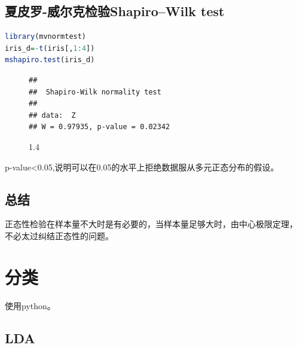 \documentclass[11pt,a4paper]{article}\usepackage[]{graphicx}\usepackage[]{color}
\makeatletter
\newenvironment{kframe}{%
 \def\at@end@of@kframe{}%
 \ifinner\ifhmode%
  \def\at@end@of@kframe{\end{minipage}}%
  \begin{minipage}{\columnwidth}%
 \fi\fi%
 \def\FrameCommand##1{\hskip\@totalleftmargin \hskip-\fboxsep
 \colorbox{shadecolor}{##1}\hskip-\fboxsep
     \hskip-\linewidth \hskip-\@totalleftmargin \hskip\columnwidth}%
 \MakeFramed {\advance\hsize-\width
   \@totalleftmargin\z@ \linewidth\hsize
   \@setminipage}}%
 {\par\unskip\endMakeFramed%
 \at@end@of@kframe}
\newenvironment{knitrout}{}{} %
\makeatother
\begin{document}
  \subsection{夏皮罗-威尔克检验Shapiro–Wilk test}
  \begin{lstlisting}[language=R, caption=Shapiro–Wilk test,label={labelkode}]
   library(mvnormtest)
iris_d=-t(iris[,1:4])
mshapiro.test(iris_d)
  \end{lstlisting}
  		\begin{figure}[H]
      \begin{center}
\begin{knitrout}
\color{fgcolor}\begin{kframe}
\begin{verbatim}
## 
## 	Shapiro-Wilk normality test
## 
## data:  Z
## W = 0.97935, p-value = 0.02342
\end{verbatim}
\end{kframe}
\end{knitrout}
      \caption{1.4}
      \end{center}
      \end{figure}
  p-value<0.05,说明可以在0.05的水平上拒绝数据服从多元正态分布的假设。
  
	\subsection{总结}
	正态性检验在样本量不大时是有必要的，当样本量足够大时，由中心极限定理，
	不必太过纠结正态性的问题。
	\section{分类}
	使用python。
	\subsection{LDA}
\end{document}
